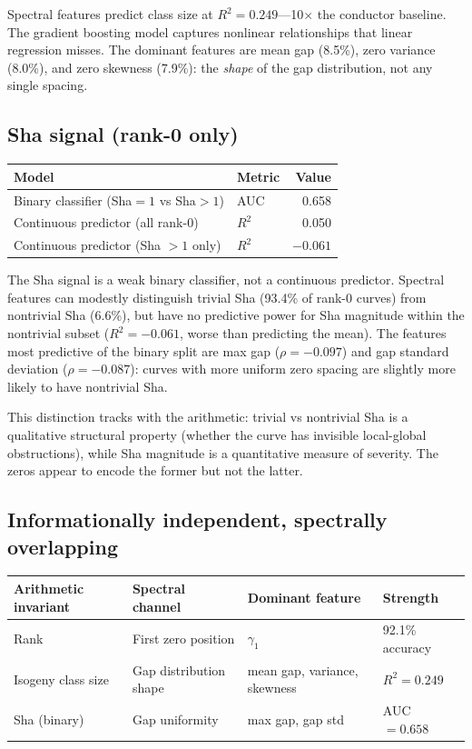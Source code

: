 \documentclass[11pt,a4paper]{article}
\begin{document}
Spectral features predict class size at $R^2 = 0.249$---10$\times$ the conductor baseline. The gradient boosting model captures nonlinear relationships that linear regression misses. The dominant features are mean gap (8.5\%), zero variance (8.0\%), and zero skewness (7.9\%): the \emph{shape} of the gap distribution, not any single spacing.

\subsection{Sha signal (rank-0 only)}

\begin{center}
\begin{tabular}{llr}
\toprule
\textbf{Model} & \textbf{Metric} & \textbf{Value} \\
\midrule
Binary classifier (Sha${}=1$ vs Sha${}>1$) & AUC & 0.658 \\
Continuous predictor (all rank-0) & $R^2$ & 0.050 \\
Continuous predictor (Sha ${}>1$ only) & $R^2$ & $-0.061$ \\
\bottomrule
\end{tabular}
\end{center}

The Sha signal is a weak binary classifier, not a continuous predictor. Spectral features can modestly distinguish trivial Sha (93.4\% of rank-0 curves) from nontrivial Sha (6.6\%), but have no predictive power for Sha magnitude within the nontrivial subset ($R^2 = -0.061$, worse than predicting the mean). The features most predictive of the binary split are max gap ($\rho = -0.097$) and gap standard deviation ($\rho = -0.087$): curves with more uniform zero spacing are slightly more likely to have nontrivial Sha.

This distinction tracks with the arithmetic: trivial vs nontrivial Sha is a qualitative structural property (whether the curve has invisible local-global obstructions), while Sha magnitude is a quantitative measure of severity. The zeros appear to encode the former but not the latter.

\subsection{Informationally independent, spectrally overlapping}

\begin{center}
\begin{tabular}{llll}
\toprule
\textbf{Arithmetic invariant} & \textbf{Spectral channel} & \textbf{Dominant feature} & \textbf{Strength} \\
\midrule
Rank & First zero position & $\gamma_1$ & 92.1\% accuracy \\
Isogeny class size & Gap distribution shape & mean gap, variance, skewness & $R^2 = 0.249$ \\
Sha (binary) & Gap uniformity & max gap, gap std & AUC $= 0.658$ \\
\bottomrule
\end{tabular}
\end{center}
\end{document}
